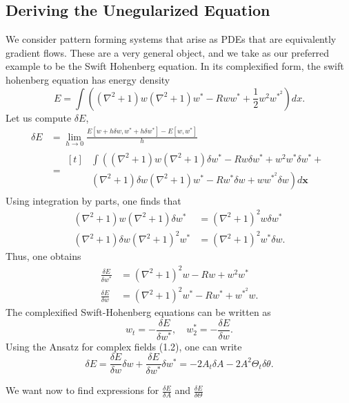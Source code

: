\documentclass[12pt]{article}
\numberwithin{equation}{section}
\begin{document}
\subsection{Deriving the Unegularized Equation}
\par We consider pattern forming systems that arise as PDEs that are equivalently gradient flows. These are a very general object, and we take as our preferred example to be the Swift Hohenberg equation. In its complexified form, the swift hohenberg equation has energy density
\begin{equation}
    E = \int \left( (\nabla^2+1)w(\nabla^2+1)w^{*}-Rww^{*}+\frac{1}{2}w^2w^{*^2}\right)dx.
\end{equation}
Let us compute $\delta E$,
\begin{align*}
    \delta E &= \lim_{h \rightarrow 0}\frac{E[w+h\delta w, w^* + h\delta w^*]-E[w,w^*]}{h}\\
        &= \begin{aligned}[t]
            & \int \left( (\nabla^2+1)w(\nabla^2+1)\delta w^* -Rw\delta w^* + w^2w^*\delta w^* + \right. \\
            & \left. (\nabla^2+1)\delta w (\nabla^2+1)w^* -Rw^*\delta w + ww^{*^2}\delta w \right) d\bm{x}    
        \end{aligned}
\end{align*}
Using integration by parts, one finds that
\begin{align*}
    (\nabla^2+1)w(\nabla^2+1)\delta w^* &= (\nabla^2 +1)^2w\delta w^*\\
    (\nabla^2+1)\delta w (\nabla^2+1)^2w^* &= (\nabla^2+1)^2w^*\delta w.
\end{align*}
Thus, one obtains
\begin{align}
    \frac{\delta E}{\delta w^*} &= (\nabla^2+1)^2w - Rw + w^2w^*\\
    \frac{\delta E}{\delta w} &= (\nabla^2+1)^2 w^* -Rw^* + w^{*^2}w.
\end{align} 
The complexified Swift-Hohenberg equations can be written as
\begin{equation}
    w_t = - \frac{\delta E}{\delta w^*}, \quad w^*_2 = -\frac{\delta E}{\delta w}.
\end{equation}
Using the Ansatz for complex fields (1.2), one can write
\begin{equation}
    \delta E = \frac{\delta E}{\delta w}\delta w + \frac{\delta E}{\delta w^*}\delta w^* = -2A_t\delta A - 2A^2\Theta_t \delta \theta.
\end{equation}
\par We want now to find expressions for $\frac{\delta E}{\delta A}$ and $\frac{\delta E}{\delta \Theta}$
\end{document}
